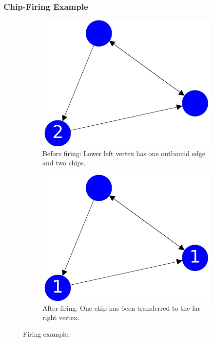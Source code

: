 \documentclass{beamer}
\begin{document}
\begin{frame}
\frametitle{Chip-Firing Example}


\begin{figure}[h!]
  \centering
  \begin{subfigure}[b]{0.4\linewidth}
    \includegraphics[width=\linewidth]{sandpile_simple_0}
    \caption{Before firing: Lower left vertex has one outbound edge and two chips.}
  \end{subfigure}
  \begin{subfigure}[b]{0.4\linewidth}
    \includegraphics[width=\linewidth]{sandpile_simple_1}
    \caption{After firing: One chip has been transferred to the far right vertex.}
  \end{subfigure}
  \caption{Firing example.}

\end{figure}

\end{frame}
\end{document}
